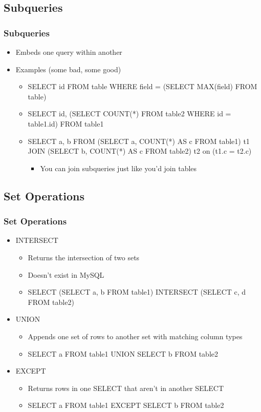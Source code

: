 \documentclass{beamer}
\begin{document}
\subsection{Subqueries}
\begin{frame}
    \frametitle{Subqueries}
    \begin{itemize}
        \item Embeds one query within another
        \item Examples (some bad, some good)
        \begin{itemize}
            \item SELECT id FROM table WHERE field = (SELECT MAX(field) FROM table)
            \item SELECT id, (SELECT COUNT(*) FROM table2 WHERE id = table1.id) FROM table1
            \item SELECT a, b FROM (SELECT a, COUNT(*) AS c FROM table1) t1 JOIN (SELECT b, COUNT(*) AS c FROM table2) t2 on (t1.c = t2.c)
            \begin{itemize}
                \item You can join subqueries just like you'd join tables
            \end{itemize}
        \end{itemize}
    \end{itemize}
\end{frame}

\subsection{Set Operations}
\begin{frame}
    \frametitle{Set Operations}
    \begin{itemize}
        \item INTERSECT
        \begin{itemize}
            \item Returns the intersection of two sets
            \item Doesn't exist in MySQL
            \item SELECT (SELECT a, b FROM table1) INTERSECT (SELECT c, d FROM table2)
        \end{itemize}
        \item UNION
        \begin{itemize}
            \item Appends one set of rows to another set with matching column types
            \item SELECT a FROM table1 UNION SELECT b FROM table2
        \end{itemize}
        \item EXCEPT
        \begin{itemize}
            \item Returns rows in one SELECT that aren't in another SELECT
            \item SELECT a FROM table1 EXCEPT SELECT b FROM table2
        \end{itemize}
    \end{itemize}
\end{frame}
\end{document}
